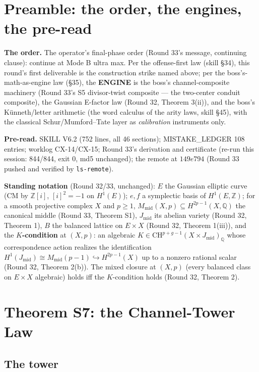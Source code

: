 \documentclass[11pt]{article}
\newcommand{\Z}{\mathbb{Z}}
\newcommand{\Q}{\mathbb{Q}}
\newcommand{\CH}{\mathrm{CH}}
\begin{document}
\section{Preamble: the order, the engines, the pre-read}

\textbf{The order.} The operator's final-phase order (Round 33's message,
continuing clause): continue at Mode B ultra max. Per the offense-first
law (skill \S34), this round's first deliverable is the construction
strike named above; per the boss's-math-as-engine law (\S35), the
\textbf{ENGINE} is the boss's channel-composite machinery (Round 33's S5
divisor-twist composite --- the two-center conduit composite), the
Gaussian E-factor law (Round 32, Theorem 3(ii)), and the boss's
K\"unneth/letter arithmetic (the word calculus of the arity laws,
skill \S45), with the classical Schur/Mumford--Tate layer as
\emph{calibration} instruments only.

\textbf{Pre-read.} SKILL V6.2 (752 lines, all 46 sections); MISTAKE\_LEDGER
108 entries; worklog CX-14/CX-15; Round 33's derivation and certificate
(re-run this session: 844/844, exit 0, md5 unchanged); the remote at
$149e794$ (Round 33 pushed and verified by \texttt{ls-remote}).

\textbf{Standing notation} (Round 32/33, unchanged): $E$ the Gaussian
elliptic curve (CM by $\Z[i]$, $[i]^2=-1$ on $H^1(E)$); $e,f$ a symplectic
basis of $H^1(E,\Z)$; for a smooth projective complex $X$ and $p\ge1$,
$M_{\mathrm{mid}}(X,p)\subseteq H^{2p-1}(X,\Q)$ the canonical middle
(Round 33, Theorem S1), $J_{\mathrm{mid}}$ its abelian variety (Round 32,
Theorem 1), $B$ the balanced lattice on $E\times X$
(Round 32, Theorem 1(iii)), and the \textbf{$K$-condition} at $(X,p)$:
an algebraic $K\in\CH^{p+g-1}(X\times J_{\mathrm{mid}})_\Q$ whose
correspondence action realizes the identification
$H^1(J_{\mathrm{mid}})\cong M_{\mathrm{mid}}(p-1)\hookrightarrow
H^{2p-1}(X)$ up to a nonzero rational scalar (Round 32, Theorem 2(b)).
The mixed closure at $(X,p)$ (every balanced class on $E\times X$
algebraic) holds iff the $K$-condition holds (Round 32, Theorem 2).

\section{Theorem S7: the Channel-Tower Law}

\subsection{The tower}
\end{document}
